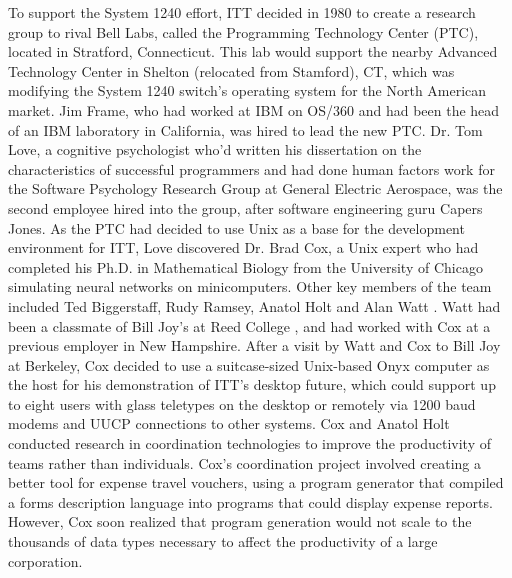 \documentclass[acmsmall,screen]{acmart}
\begin{document}
To support the System 1240 effort, ITT decided in 1980 to create a research group to rival Bell Labs, called the Programming Technology Center (PTC), located in Stratford, Connecticut. This lab would support the nearby Advanced Technology Center in Shelton (relocated from Stamford), CT, which was modifying the System 1240 switch's operating system for the North American market. Jim Frame, who had worked at IBM on OS/360 and had been the head of an IBM laboratory in California, was hired to lead the new PTC. Dr. Tom Love, a cognitive psychologist who'd written his dissertation on the characteristics of successful programmers and had done human factors work for the Software Psychology Research Group at General Electric Aerospace, was the second employee hired into the group, after software engineering guru Capers Jones. As the PTC had decided to use Unix as a base for the development environment for ITT, Love discovered Dr. Brad Cox, a Unix expert who had completed his Ph.D. in Mathematical Biology from the University of Chicago simulating neural networks on minicomputers. Other key members of the team included Ted Biggerstaff, Rudy Ramsey, Anatol Holt and Alan Watt \citep[5]{love_skype_2019}. Watt had been a classmate of Bill Joy's at Reed College \citep[15--16]{cox_oral_2016}, and had worked with Cox at a previous employer in New Hampshire. After a visit by Watt and Cox to Bill Joy at Berkeley, Cox decided to use a suitcase-sized Unix-based Onyx computer as the host for his demonstration of ITT's desktop future, which could support up to eight users with glass teletypes on the desktop or remotely via 1200 baud modems and UUCP connections to other systems. Cox and Anatol Holt conducted research in coordination technologies to improve the productivity of teams rather than individuals. Cox's coordination project involved creating a better tool for expense travel vouchers, using a program generator that compiled a forms description language into programs that could display expense reports. However, Cox soon realized that program generation would not scale to the thousands of data types necessary to affect the productivity of a large corporation.
\end{document}

